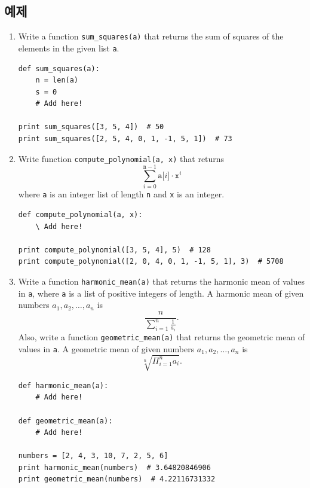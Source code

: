 \documentclass[../main.tex]{subfiles}
\begin{document}
\subsection{예제}
\begin{enumerate}
\item Write a function \texttt{sum\_squares(a)} that returns the sum of squares of the elements in the given list \texttt{a}.
\begin{verbatim}
def sum_squares(a):
	n = len(a)
	s = 0
	# Add here!

print sum_squares([3, 5, 4])  # 50
print sum_squares([2, 5, 4, 0, 1, -1, 5, 1])  # 73
\end{verbatim}

\item Write function \texttt{compute\_polynomial(a, x)} that returns
\[
\sum_{i = 0}^{\texttt{n} - 1} \texttt{a[}i\texttt{]} \cdot \texttt{x}^i
\]
where \texttt{a} is an integer list of length \texttt{n} and \texttt{x} is an integer.
\begin{verbatim}
def compute_polynomial(a, x):
	\ Add here!

print compute_polynomial([3, 5, 4], 5)  # 128
print compute_polynomial([2, 0, 4, 0, 1, -1, 5, 1], 3)  # 5708
\end{verbatim}

\item Write a function \texttt{harmonic\_mean(a)} that returns the harmonic mean of values in \texttt{a}, where \texttt{a} is a list of positive integers of length.
A harmonic mean of given numbers $a_1, a_2, \dots, a_n$ is
\[
\frac{n}{\sum_{i = 1}^{n} \frac{1}{a_i}}.
\]
Also, write a function \texttt{geometric\_mean(a)} that returns the geometric mean of values in \texttt{a}.
A geometric mean of given numbers $a_1, a_2, \dots, a_n$ is
\[
\sqrt[n]{\Pi_{i = 1}^{n} a_i}.
\]

\begin{verbatim}
def harmonic_mean(a):
	# Add here!
	
def geometric_mean(a):
	# Add here!

numbers = [2, 4, 3, 10, 7, 2, 5, 6]
print harmonic_mean(numbers)  # 3.64820846906
print geometric_mean(numbers)  # 4.22116731332
\end{verbatim}


\end{enumerate}
\end{document}
